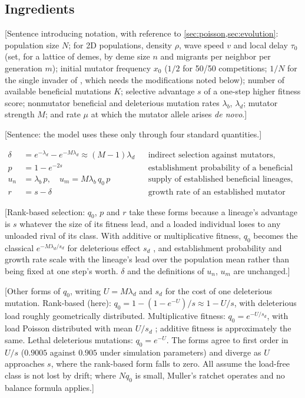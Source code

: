 \subsection{Ingredients} \label{sec:model:parameters}

[Sentence introducing notation, with reference to \cref{sec:poisson,sec:evolution}: population size $N$; for 2D populations, density $\rho$, wave speed $v$ and local delay $\tau_0$ (set, for a lattice of demes, by deme size $n$ and migrants per neighbor per generation $m$); initial mutator frequency $x_0$ ($1/2$ for 50/50 competitions; $1/N$ for the single invader of \citet{raynes2018sign}, which needs the modifications noted below); number of available beneficial mutations $K$; selective advantage $s$ of a one-step higher fitness score; nonmutator beneficial and deleterious mutation rates $\lambda_b$, $\lambda_d$; mutator strength $M$; and rate $\mu$ at which the mutator allele arises \textit{de novo}.]

[Sentence: the model uses these only through four standard quantities.]

\begin{align}
  \delta &= e^{-\lambda_d} - e^{-M \lambda_d} \approx (M - 1) \lambda_d
  && \text{indirect selection against mutators,} \label{eq:delta} \\
  p &= 1 - e^{-2s}
  && \text{establishment probability of a beneficial mutation,} \label{eq:establishment} \\
  u_n &= \lambda_b\, p, \quad
  u_m = M \lambda_b\, q_0\, p
  && \text{supply of established beneficial lineages,} \label{eq:supply} \\
  r &= s - \delta
  && \text{growth rate of an established mutator lineage.} \label{eq:growth}
\end{align}

[Rank-based selection: $q_0$, $p$ and $r$ take these forms because a lineage's advantage is $s$ whatever the size of its fitness lead, and a loaded individual loses to any unloaded rival of its class.
With additive or multiplicative fitness, $q_0$ becomes the classical $e^{-M \lambda_d / s_d}$ for deleterious effect $s_d$ \citep{haigh1978accumulation}, and establishment probability and growth rate scale with the lineage's lead over the population mean rather than being fixed at one step's worth.
$\delta$ and the definitions of $u_n$, $u_m$ are unchanged.]

[Other forms of $q_0$, writing $U = M \lambda_d$ and $s_d$ for the cost of one deleterious mutation.
Rank-based (here): $q_0 = 1 - (1 - e^{-U}) / s \approx 1 - U / s$, with deleterious load roughly geometrically distributed.
Multiplicative fitness: $q_0 = e^{-U / s_d}$, with load Poisson distributed with mean $U / s_d$ \citep{haigh1978accumulation}; additive fitness is approximately the same.
Lethal deleterious mutations: $q_0 = e^{-U}$.
The forms agree to first order in $U / s$ ($0.9005$ against $0.905$ under simulation parameters) and diverge as $U$ approaches $s$, where the rank-based form falls to zero.
All assume the load-free class is not lost by drift; where $N q_0$ is small, Muller's ratchet operates and no balance formula applies.]

